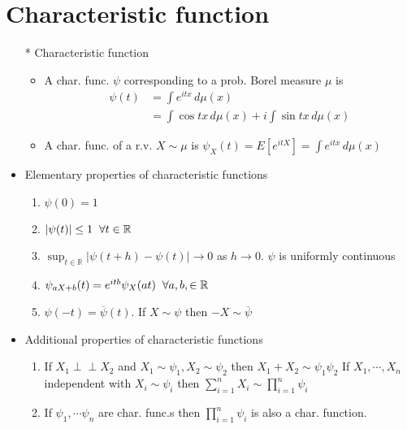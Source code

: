 \documentclass[12pt, A4]{article}
\newcommand{\indep}{\perp \!\!\! \perp}
\begin{document}
\section{Characteristic function}
\begin{itemize}
	\item[*] Characteristic function
	\begin{itemize}
		\item A char. func. $\psi$ corresponding to a prob. Borel measure $\mu$ is
		\begin{equation*}
			\begin{split}
				\psi(t) &=\int e^{itx}\, d\mu(x) \\
				&= \int \cos tx\,d\mu(x)+i\int \sin tx\,d\mu(x)
			\end{split}
		\end{equation*}
		\item A char. func. of a r.v. $X\sim\mu$ is $\psi_X(t)=E[e^{itX}]=\int e^{itx}\,d\mu(x)$ 
	\end{itemize}
	\item Elementary properties of characteristic functions
	\begin{enumerate}
		\item $\psi(0)=1$
		\item $|\psi(t)|\leq 1 \hspace{0.2cm} \forall t\in \mathbb{R}$
		\item $\sup_{t\in \mathbb{R}}|\psi(t+h)-\psi(t)|\rightarrow 0$ as $h\rightarrow 0$. \hspace{0.2cm}$\psi$ is uniformly continuous
		\item $\psi_{aX+b}(t)=e^{itb}\psi_{X}(at) \hspace{0.2cm} \forall a,b,\in \mathbb{R}$
		\item $\psi(-t)=\overline{\psi}(t)$. \hspace{0.2cm} If $X\sim \psi$ then $-X\sim \overline{\psi}$
	\end{enumerate}
	\item Additional properties of characteristic functions
	\begin{enumerate}
		\item If $X_1 \indep X_2$ and $X_1\sim \psi_1, X_2\sim \psi_2$ then $X_1+X_2\sim \psi_1\psi_2$ \newline If $X_1,\cdots, X_n$ independent with $X_i\sim \psi_i$ then $\sum_{i=1}^{n}X_i\sim \prod_{i=1}^{n}\psi_i$
		\item If $\psi_1, \cdots \psi_n$ are char. func.s then $\prod_{i=1}^{n}\psi_i$ is also a char. function.

\end{enumerate}
\end{itemize}
\end{document}
